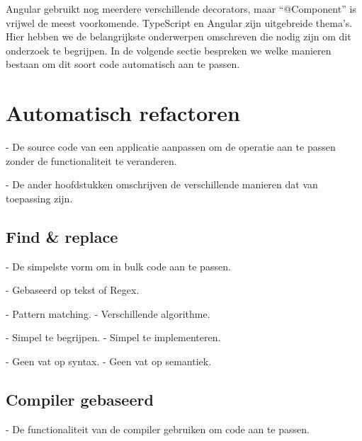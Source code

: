 Angular gebruikt nog meerdere verschillende decorators, maar ``@Component'' is vrijwel de meest voorkomende.
TypeScript en Angular zijn uitgebreide thema's.
Hier hebben we de belangrijkste onderwerpen omschreven die nodig zijn om dit onderzoek te begrijpen.
In de volgende sectie bespreken we welke manieren bestaan om dit soort code automatisch aan te passen.

\section{Automatisch refactoren}
\label{ch:stand-van-zaken:refactoring}


- De source code van een applicatie aanpassen om de operatie aan te passen zonder de functionaliteit te veranderen.


- De ander hoofdstukken omschrijven de verschillende manieren dat van toepassing zijn.

\subsection{Find \& replace}
\label{ch:stand-van-zaken:refactoring:find-and-replace}


- De simpelste vorm om in bulk code aan te passen.


- Gebaseerd op tekst of Regex.


- Pattern matching.
- Verschillende algorithme.


- Simpel te begrijpen.
- Simpel te implementeren.


- Geen vat op syntax.
- Geen vat op semantiek.

\subsection{Compiler gebaseerd}
\label{ch:stand-van-zaken:refactoring:compiler}


- De functionaliteit van de compiler gebruiken om code aan te passen.

